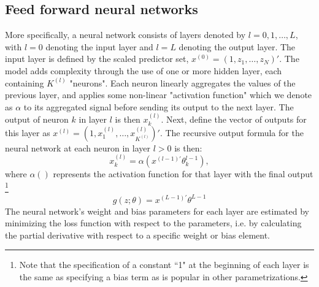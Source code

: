 \documentclass{article}
\begin{document}
\subsection{Feed forward neural networks}
More specifically, a neural network consists of layers denoted by $l = 0, 1, \dots, L$, with $l = 0$ denoting the input layer and $l = L$ denoting the output layer. The input layer is defined by the scaled predictor set, $x^{(0)} = (1, z_1, \dots, z_N)'$. The model adds complexity through the use of one or more hidden layer, each containing $K^{(l)}$ "neurons". Each neuron linearly aggregates the values of the previous layer, and applies some non-linear "activation function" which we denote as $\alpha$ to its aggregated signal before sending its output to the next layer. The output of neuron $k$ in layer $l$ is then $x_k^{(l)}$. Next, define the vector of outputs for this layer as $x^{(l)} = (1, x_1^{(l)}, \dots, x_{K^(l)}^{(l)})'$.  The recursive output formula for the neural network at each neuron in layer $l > 0$ is then:
\begin{equation}
x_k^{(l)} = \alpha(x^{(l-1)'}\theta_k^{l-1}),
\end{equation}
where $\alpha()$ represents the activation function for that layer with the final output \footnote{Note that the specification of a constant ``1" at the beginning of each layer is the same as specifying a bias term as is popular in other parametrizations. }
\begin{equation}
g(z;\theta) = x^{(L-1)'}\theta^{L-1}
\end{equation}
The neural network's weight and bias parameters for each layer are estimated by minimizing the loss function with respect to the parameters, i.e. by calculating the partial derivative with respect to a specific weight or bias element. 
\end{document}
